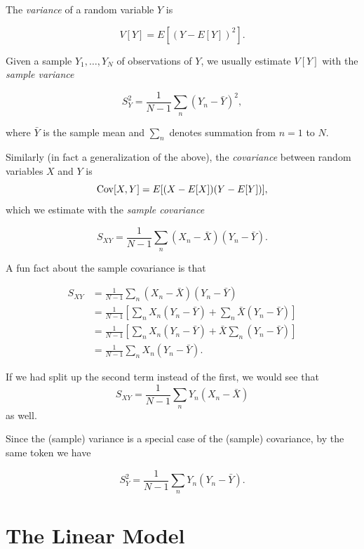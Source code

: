 \documentclass[12pt,oneside,openany]{book}
\begin{document}
The \emph{variance} of a random variable \(Y\) is

\begin{equation}
V[Y] = E[(Y - E[Y])^2].
\end{equation}

Given a sample \(Y_1, \ldots, Y_N\) of observations of \(Y\), we usually
estimate \(V[Y]\) with the \emph{sample variance}

\begin{equation}
S_Y^2 = \frac{1}{N-1} \sum_n (Y_n - \bar{Y})^2,
\end{equation}

where \(\bar{Y}\) is the sample mean and \(\sum_n\) denotes summation
from \(n = 1\) to \(N\).

Similarly (in fact a generalization of the above), the \emph{covariance}
between random variables \(X\) and \(Y\) is \[
\mathop{\rm Cov}\nolimits[X, Y] = E[(X - E[X]) (Y - E[Y])],
\] which we estimate with the \emph{sample covariance}

\begin{equation}
S_{XY} = \frac{1}{N-1} \sum_n (X_n - \bar{X}) (Y_n - \bar{Y}).
\end{equation}

A fun fact about the sample covariance is that

\begin{align}
S_{XY}
&= \frac{1}{N-1} \sum_n (X_n - \bar{X}) (Y_n - \bar{Y}) \\
&= \frac{1}{N-1} \left[ \sum_n X_n (Y_n - \bar{Y}) + \sum_n \bar{X} (Y_n - \bar{Y}) \right] \\
&= \frac{1}{N-1} \left[ \sum_n X_n (Y_n - \bar{Y}) + \bar{X} \sum_n (Y_n - \bar{Y}) \right] \\
&= \frac{1}{N-1} \sum_n X_n (Y_n - \bar{Y}).
\end{align}

If we had split up the second term instead of the first, we would see
that \[
S_{XY} = \frac{1}{N-1} \sum_n Y_n (X_n - \bar{X})
\] as well.

Since the (sample) variance is a special case of the (sample)
covariance, by the same token we have

\begin{equation}
S_Y^2 = \frac{1}{N-1} \sum_n Y_n (Y_n - \bar{Y}).
\end{equation}

\section{The Linear Model}\label{the-linear-model}
\end{document}

